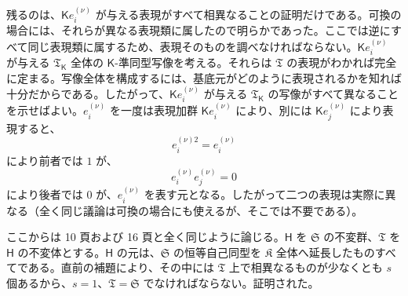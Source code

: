 残るのは、$\mathsf K e_i^{(\nu)}$ が与える表現がすべて相異なることの証明だけである。可換の場合には、それらが異なる表現類に属したので明らかであった。ここでは逆にすべて同じ表現類に属するため、表現そのものを調べなければならない。$\mathsf K e_i^{(\nu)}$ が与える $\mathfrak T_{\mathsf{K}}$ 全体の $\mathsf{K}$-準同型写像を考える。それらは $\mathfrak T$ の表現がわかれば完全に定まる。写像全体を構成するには、基底元がどのように表現されるかを知れば十分だからである。したがって、$\mathsf K e_i^{(\nu)}$ が与える $\mathfrak T_{\mathsf{K}}$ の写像がすべて異なることを示せばよい。$e_i^{(\nu)}$ を一度は表現加群 $\mathsf K e_i^{(\nu)}$ により、別には $\mathsf K e_j^{(\nu)}$ により表現すると、
\[
e_i^{(\nu)2}=e_i^{(\nu)}
\]
により前者では $1$ が、
\[
e_i^{(\nu)}e_j^{(\nu)}=0
\]
により後者では $0$ が、$e_i^{(\nu)}$ を表す元となる。したがって二つの表現は実際に異なる（全く同じ議論は可換の場合にも使えるが、そこでは不要である）。

ここからは 10 頁および 16 頁と全く同じように論じる。$\mathsf{H}$ を $\mathfrak S$ の不変群、$\mathfrak T$ を $\mathsf{H}$ の不変体とする。$\mathsf{H}$ の元は、$\mathfrak S$ の恒等自己同型を $\mathfrak K$ 全体へ延長したものすべてである。直前の補題により、その中には $\mathfrak T$ 上で相異なるものが少なくとも $s$ 個あるから、$s=1$、$\mathfrak T=\mathfrak S$ でなければならない。証明された。

